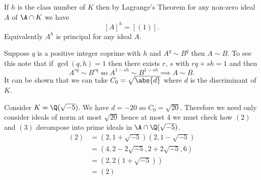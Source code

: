 If $h$ is the class number of $K$ then by Lagrange's Theorem for any non-zero ideal $A$ of $\A\cap K$ we have
\[ [A]^h = [(1)] . \]
Equivalently $A^h$ is principal for any ideal $A$.

Suppose $q$ is a positive integer coprime with $h$ and $A^q\sim B^q$ then $A\sim B$.  To see this note that if $\gcd(q,h)=1$ then %
there exists $r$, $s$ with $rq+sh=1$ and then
\[ A^{rq}\sim B^{rq} \text{ so } A^{1-sh} \sim B^{1-sh} \implies A \sim B . \]
It can be shown that we can take $C_0=\sqrt{\abs{d}}$ where $d$ is the discriminant of $K$.

\eg Consider $K=\Q(\sqrt{-5})$.  We have $d=-20$ so $C_0=\sqrt{20}$.  Therefore we need only consider ideals of norm at most $\sqrt{20}$ hence at most $4$ we must check how $(2)$ and $(3)$ decompose into prime ideals in $\A\cap\Q(\sqrt{-5})$.
\begin{align*}
(2) &= (2,1+\sqrt{-5})(2,1-\sqrt{-5}) \\
&= (4,2-2\sqrt{-5},2+2\sqrt{-5},6) \\
&= (2,2(1+\sqrt{-5})) \\
&= (2)
\end{align*}